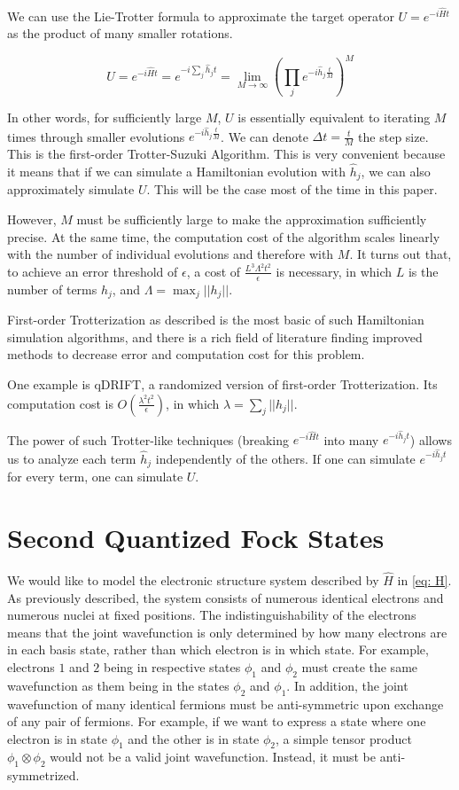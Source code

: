 We can use the Lie-Trotter formula to approximate the target operator $U = e^{-i\hat{H}t}$ as the product of many smaller rotations.

\begin{equation}
    U = e^{-i\hat{H}t} = e^{-i\sum_j \hat{h}_jt} = \lim_{M \rightarrow \infty} (\prod_j e^{-i\hat{h}_j\frac{t}{M}})^M
\end{equation}

In other words, for sufficiently large $M$, $U$ is essentially equivalent to iterating $M$ times through smaller evolutions $e^{-i\hat{h}_j\frac{t}{M}}$. We can denote $\Delta t = \frac{t}{M}$ the step size. This is the first-order Trotter-Suzuki Algorithm. This is very convenient because it means that if we can simulate a Hamiltonian evolution with $\hat{h}_j$, we can also approximately simulate $U$. This will be the case most of the time in this paper.

However, $M$ must be sufficiently large to make the approximation sufficiently precise. At the same time, the computation cost of the algorithm scales linearly with the number of individual evolutions and therefore with $M$. It turns out that, to achieve an error threshold of $\epsilon$, a cost of $\frac{L^3\Lambda^2t^2}{\epsilon}$ is necessary, in which $L$ is the number of terms $h_j$, and $\Lambda = \max_j ||h_j||$.

First-order Trotterization as described is the most basic of such Hamiltonian simulation algorithms, and there is a rich field of literature finding improved methods to decrease error and computation cost for this problem.

One example is qDRIFT, a randomized version of first-order Trotterization. Its computation cost is $O(\frac{\lambda^2 t^2}{\epsilon})$, in which $\lambda = \sum_j ||h_j||$.

The power of such Trotter-like techniques (breaking $e^{-i\hat{H}t}$ into many $e^{-i\hat{h}_jt}$) allows us to analyze each term $\hat{h}_j$ independently of the others. If one can simulate $e^{-i\hat{h}_jt}$ for every term, one can simulate $U$.

\section{Second Quantized Fock States}

We would like to model the electronic structure system described by $\hat{H}$ in \eqref{eq: H}. As previously described, the system consists of numerous identical electrons and numerous nuclei at fixed positions. The indistinguishability of the electrons means that the joint wavefunction is only determined by how many electrons are in each basis state, rather than which electron is in which state. For example, electrons $1$ and $2$ being in respective states $\phi_1$ and $\phi_2$ must create the same wavefunction as them being in the states $\phi_2$ and $\phi_1$. In addition, the joint wavefunction of many identical fermions must be anti-symmetric upon exchange of any pair of fermions. For example, if we want to express a state where one electron is in state $\phi_1$ and the other is in state $\phi_2$, a simple tensor product $\phi_1 \otimes \phi_2$ would not be a valid joint wavefunction. Instead, it must be anti-symmetrized.

